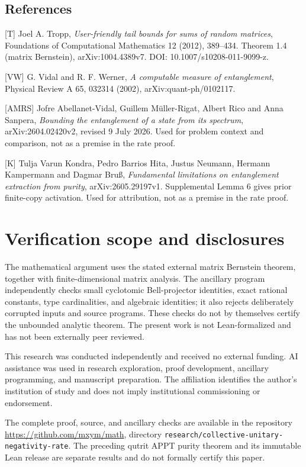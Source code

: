 \documentclass[11pt]{article}
\begin{document}
\hypertarget{references}{%
\clearpage\subsection{References}\label{references}}

{[}T{]} Joel A. Tropp, \emph{User-friendly tail bounds for sums of random matrices}, Foundations of Computational Mathematics 12 (2012), 389--434. Theorem 1.4 (matrix Bernstein), arXiv:1004.4389v7. DOI: 10.1007/s10208-011-9099-z.

{[}VW{]} G. Vidal and R. F. Werner, \emph{A computable measure of entanglement}, Physical Review A 65, 032314 (2002), arXiv:quant-ph/0102117.

{[}AMRS{]} Jofre Abellanet-Vidal, Guillem Müller-Rigat, Albert Rico and Anna Sanpera, \emph{Bounding the entanglement of a state from its spectrum}, arXiv:2604.02420v2, revised 9 July 2026. Used for problem context and comparison, not as a premise in the rate proof.

{[}K{]} Tulja Varun Kondra, Pedro Barrios Hita, Justus Neumann, Hermann Kampermann and Dagmar Bruß, \emph{Fundamental limitations on entanglement extraction from purity}, arXiv:2605.29197v1. Supplemental Lemma 6 gives prior finite-copy activation. Used for attribution, not as a premise in the rate proof.


\section*{Verification scope and disclosures}
The mathematical argument uses the stated external matrix Bernstein theorem, together with finite-dimensional matrix analysis. The ancillary program independently checks small cyclotomic Bell-projector identities, exact rational constants, type cardinalities, and algebraic identities; it also rejects deliberately corrupted inputs and source programs. These checks do not by themselves certify the unbounded analytic theorem. The present work is not Lean-formalized and has not been externally peer reviewed.

This research was conducted independently and received no external funding. AI assistance was used in research exploration, proof development, ancillary programming, and manuscript preparation. The affiliation identifies the author's institution of study and does not imply institutional commissioning or endorsement.

The complete proof, source, and ancillary checks are available in the repository \url{https://github.com/mxym/math}, directory \texttt{research/collective-unitary-negativity-rate}. The preceding qutrit APPT purity theorem and its immutable Lean release are separate results and do not formally certify this paper.
\end{document}
